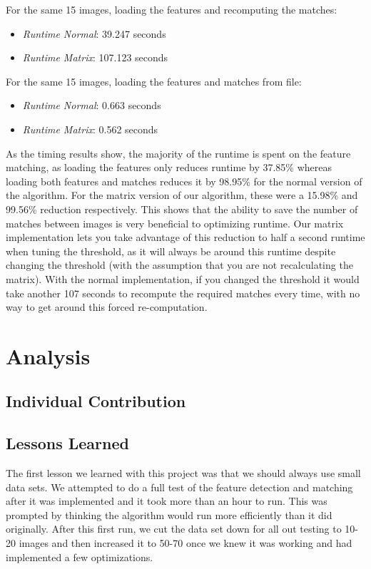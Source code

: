 \documentclass[12pt]{article}
\begin{document}
	
	
	For the same 15 images, loading the features and recomputing the matches: 
	\begin{itemize}
		\item \textit{Runtime Normal}: 39.247 seconds
		\item \textit{Runtime Matrix}: 107.123 seconds
	\end{itemize}

	For the same 15 images, loading the features and matches from file:
	\begin{itemize}
		\item \textit{Runtime Normal}: 0.663 seconds
		\item \textit{Runtime Matrix}: 0.562 seconds
	\end{itemize}

	As the timing results show, the majority of the runtime is spent on the feature matching, as loading the features only reduces runtime by 37.85\% whereas loading both features and matches reduces it by 98.95\% for the normal version of the algorithm. For the matrix version of our algorithm, these were a 15.98\% and 99.56\% reduction respectively. This shows that the ability to save the number of matches between images is very beneficial to optimizing runtime. Our matrix implementation lets you take advantage of this reduction to half a second runtime when tuning the threshold, as it will always be around this runtime despite changing the threshold (with the assumption that you are not recalculating the matrix). With the normal implementation, if you changed the threshold it would take another 107 seconds to recompute the required matches every time, with no way to get around this forced re-computation.


\section{Analysis}

\subsection{Individual Contribution}
	

\subsection{Lessons Learned}
	The first lesson we learned with this project was that we should always use small data sets. We attempted to do a full test of the feature detection and matching after it was implemented and it took more than an hour to run. This was prompted by thinking the algorithm would run more efficiently than it did originally. After this first run, we cut the data set down for all out testing to 10-20 images and then increased it to 50-70 once we knew it was working and had implemented a few optimizations.
	
\end{document}
